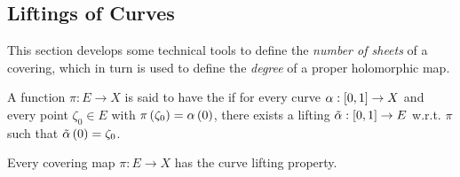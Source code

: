 \documentclass[../Moduli_Spaces_of_Riemann_Surfaces.tex]{subfiles}
\begin{document}
    \subsection{Liftings of Curves}
    This section develops some technical tools to define the \textit{number of sheets} of a covering, which in turn is used to define the \textit{degree} of a proper holomorphic map.
    \begin{definition}
        A function $\pi:E\to X$ is said to have the  if for every curve $\alpha:\left[0,1\right]\to X$ and every point $\zeta_0\in E$ with $\pi\left(\zeta_0\right)=\alpha\left(0\right)$, there exists a lifting $\tilde{\alpha}:\left[0,1\right]\to E$ w.r.t. $\pi$ such that $\tilde{\alpha}\left(0\right)=\zeta_0$.
    \end{definition}
    \begin{proposition}
        Every covering map $\pi:E\to X$ has the curve lifting property.
    \end{proposition}
\end{document}
